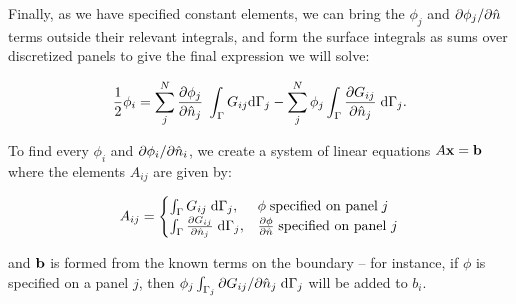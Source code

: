 %
%
%
%

Finally, as we have specified constant elements, we can bring the $\phi_j$ and $\partial \phi_j / \partial \hat{n}$ terms outside their relevant integrals, and form the surface integrals as sums over discretized panels to give the final expression we will solve:

\begin{equation}
	\frac{1}{2}\phi_i = \sum_j^{N} \frac{\partial \phi_j}{\partial \hat{n}_j}\;\int_{\Gamma}G_{ij}\text{d}\Gamma_j - \sum_j^{N} \phi_j\int_{\Gamma}\frac{\partial G_{ij}}{\partial \hat{n}_j}\;\text{d}\Gamma_j.
\end{equation}

To find every $\phi_i$ and $\partial \phi_i / \partial \hat{n}_i$, we create a system of linear equations $A\mathbf{x}=\mathbf{b}$ where the elements $A_{ij}$ are given by:

\begin{equation}
	A_{ij} = 
	\begin{cases}
		\int_{\Gamma} G_{ij}\;\text{d}\Gamma_j, & \phi\;\text{specified on panel}\;j \\
		\int_{\Gamma} \frac{\partial G_{ij}}{\partial \hat{n}_j}\;\text{d}\Gamma_j, & \frac{\partial \phi}{\partial \hat{n}}\;\text{specified on panel } j
	\end{cases}
\end{equation}

\noindent
and $\mathbf{b}$ is formed from the known terms on the boundary -- for instance, if $\phi$ is specified on a panel $j$, then $\phi_j\int_{\Gamma_j}\partial G_{ij} / \partial \hat{n}_j\;\text{d}\Gamma_j$ will be added to $b_i$. 

